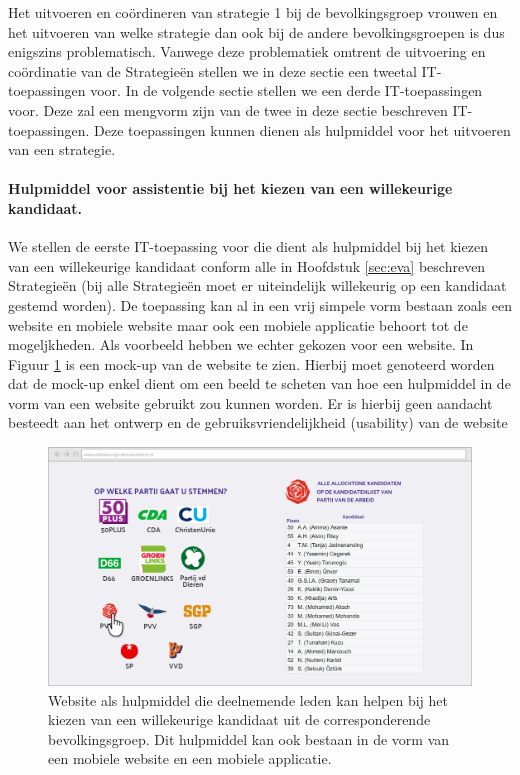 Het uitvoeren en co\"{o}rdineren van strategie 1 bij de bevolkingsgroep vrouwen en het uitvoeren van welke strategie dan ook bij de andere bevolkingsgroepen is dus enigszins problematisch. Vanwege deze problematiek omtrent de uitvoering en co\"{o}rdinatie van de Strategie\"{e}n stellen we in deze sectie een tweetal IT-toepassingen voor. In de volgende  sectie stellen we een derde IT-toepassingen voor. Deze zal een mengvorm zijn van de twee in deze sectie beschreven IT-toepassingen. Deze toepassingen kunnen dienen als hulpmiddel voor het uitvoeren van een strategie.

\paragraph{Hulpmiddel voor assistentie bij het kiezen van een willekeurige kandidaat.}
We stellen de eerste IT-toepassing voor die dient als hulpmiddel bij het kiezen van een willekeurige kandidaat conform alle in Hoofdstuk \ref{sec:eva} beschreven Strategie\"{e}n (bij alle Strategie\"{e}n moet er uiteindelijk willekeurig op een kandidaat gestemd worden). De toepassing kan al in een vrij simpele vorm bestaan zoals een website en mobiele website maar ook een mobiele applicatie behoort tot de mogeljkheden. Als voorbeeld hebben we echter gekozen voor een website. In Figuur \ref{fig:verkW} is een mock-up van de website te zien. Hierbij moet genoteerd worden dat de mock-up enkel dient om een beeld te scheten van hoe een hulpmiddel in de vorm van een website gebruikt zou kunnen worden. Er is hierbij geen aandacht besteedt aan het ontwerp en de gebruiksvriendelijkheid (usability) van de website




\begin{figure}[H]


	\includegraphics[width=\linewidth]{website_verkiezingen1.png}

			\caption{Website als hulpmiddel die deelnemende leden kan helpen bij het kiezen van een willekeurige kandidaat uit de corresponderende bevolkingsgroep. Dit hulpmiddel kan ook bestaan in de vorm van een mobiele website en een mobiele applicatie.}

\label{fig:verkW}
\end{figure}

